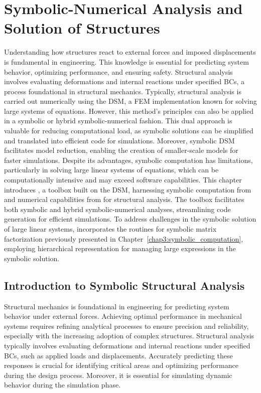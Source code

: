 
\chapter{Symbolic-Numerical Analysis and Solution of Structures}
\label{app4:trussme}

Understanding how structures react to external forces and imposed displacements is fundamental in engineering. This knowledge is essential for predicting system behavior, optimizing performance, and ensuring safety. Structural analysis involves evaluating deformations and internal reactions under specified \acp{BC}, a process foundational in structural mechanics. Typically, structural analysis is carried out numerically using the \ac{DSM}, a \ac{FEM} implementation known for solving large systems of equations. However, this method's principles can also be applied in a symbolic or hybrid symbolic-numerical fashion. This dual approach is valuable for reducing computational load, as symbolic solutions can be simplified and translated into efficient code for simulations. Moreover, symbolic \ac{DSM} facilitates model reduction, enabling the creation of smaller-scale models for faster simulations. Despite its advantages, symbolic computation has limitations, particularly in solving large linear systems of equations, which can be computationally intensive and may exceed software capabilities. This chapter introduces \TrussMe{}, a toolbox built on the \ac{DSM}, harnessing symbolic computation from \Maple{} and numerical capabilities from \Matlab{} for structural analysis. The toolbox facilitates both symbolic and hybrid symbolic-numerical analyses, streamlining code generation for efficient simulations. To address challenges in the symbolic solution of large linear systems, \TrussMe{} incorporates the routines for symbolic matrix factorization previously presented in Chapter~\ref{chap3:symbolic_computation}, employing hierarchical representation for managing large expressions in the symbolic solution.


\section{Introduction to Symbolic Structural Analysis}
\label{app4:sec:introduction}

Structural mechanics is foundational in engineering for predicting system behavior under external forces. Achieving optimal performance in mechanical systems requires refining analytical processes to ensure precision and reliability, especially with the increasing adoption of complex structures. Structural analysis typically involves evaluating deformations and internal reactions under specified \acp{BC}, such as applied loads and displacements. Accurately predicting these responses is crucial for identifying critical areas and optimizing performance during the design process. Moreover, it is essential for simulating dynamic behavior during the simulation phase.

